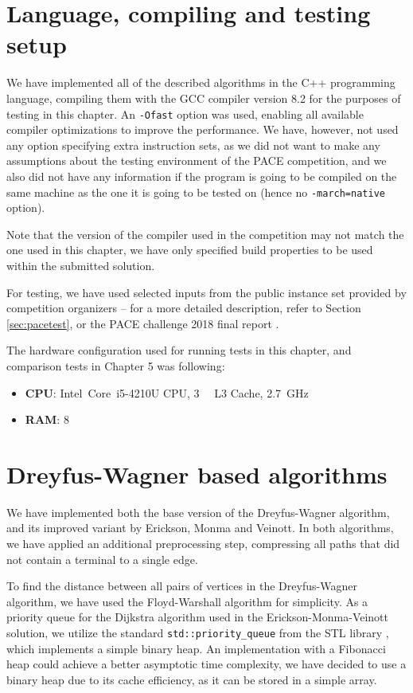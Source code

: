 \documentclass[thesis=M,english,hidelinks]{FITthesis}[2012/10/20]
\theoremstyle{definition}
\begin{document}
\section{Language, compiling and testing setup}
\label{sec:setup}

We have implemented all of the described algorithms in the C++ programming language, compiling them with the GCC compiler
version 8.2 \cite{gcc} for the purposes of testing in this chapter. An \texttt{-Ofast} option was used, enabling all
available compiler optimizations to improve the performance. We have, however, not used any option specifying extra
instruction sets, as we did not want to make any assumptions about the testing environment of the PACE competition, and
we also did not have any information if the program is going to be compiled on the same machine as the one it is going
to be tested on (hence no \texttt{-march=native} option).

Note that the version of the compiler used in the competition may not match the one used in this chapter, we have only
specified build properties to be used within the submitted solution.

For testing, we have used selected inputs from the public instance set provided by competition organizers -- for a more
detailed description, refer to Section \ref{sec:pacetest}, or the PACE challenge 2018 final report \cite{PaceReport}.

The hardware configuration used for running tests in this chapter, and comparison tests in Chapter 5 was following:

\begin{itemize}
    \item \textbf{CPU}: Intel\textregistered\ Core\texttrademark\ i5-4210U CPU, \SI{3}{\mega\byte} L3 Cache,
        \SI{2.7}{\giga\hertz}
    \item \textbf{RAM}: \SI{8}{\giga\byte}
\end{itemize}

\section{Dreyfus-Wagner based algorithms}
We have implemented both the base version of the Dreyfus-Wagner algorithm, and its improved variant by Erickson, Monma
and Veinott. In both algorithms, we have applied an additional preprocessing step, compressing all paths that did not
contain a terminal to a single edge.

To find the distance between all pairs of vertices in the Dreyfus-Wagner algorithm, we have used the Floyd-Warshall
algorithm \cite{Floyd1962} for simplicity. As a priority queue for the Dijkstra algorithm used in the
Erickson-Monma-Veinott solution, we utilize the standard \texttt{std::priority\_queue} from the STL library
\cite{STL}, which implements a simple binary heap.  An implementation with a Fibonacci heap could achieve a better
asymptotic time complexity, we have decided to use a binary heap due to its cache efficiency, as it can be stored in a
simple array.
\end{document}
